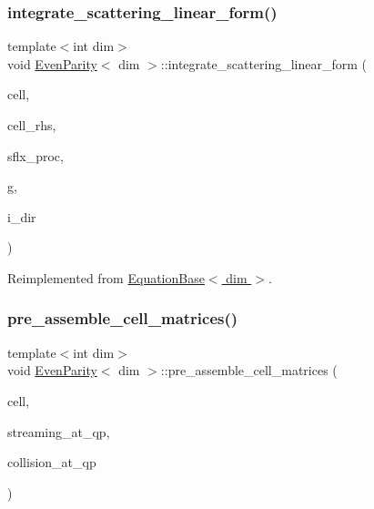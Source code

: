\mbox{\label{class_even_parity_a595082361e618c077877f92d04ebab0b}} 
\subsubsection{\texorpdfstring{integrate\+\_\+scattering\+\_\+linear\+\_\+form()}{integrate\_scattering\_linear\_form()}}
{\footnotesize\ttfamily template$<$int dim$>$ \\
void \hyperlink{class_even_parity}{Even\+Parity}$<$ dim $>$\+::integrate\+\_\+scattering\+\_\+linear\+\_\+form (\begin{DoxyParamCaption}\item[{typename Do\+F\+Handler$<$ dim $>$\+::active\+\_\+cell\+\_\+iterator \&}]{cell,  }\item[{Vector$<$ double $>$ \&}]{cell\+\_\+rhs,  }\item[{std\+::vector$<$ Vector$<$ double $>$ $>$ \&}]{sflx\+\_\+proc,  }\item[{const unsigned int \&}]{g,  }\item[{const unsigned int \&}]{i\+\_\+dir }\end{DoxyParamCaption})\hspace{0.3cm}{\ttfamily [virtual]}}



Reimplemented from \hyperlink{class_equation_base_aca5998c1afd2b89ee93d3fbbfde7f3d0}{Equation\+Base$<$ dim $>$}.

\mbox{\label{class_even_parity_a4cc64002161193e2227e962c9ecb8cf5}} 
\subsubsection{\texorpdfstring{pre\+\_\+assemble\+\_\+cell\+\_\+matrices()}{pre\_assemble\_cell\_matrices()}}
{\footnotesize\ttfamily template$<$int dim$>$ \\
void \hyperlink{class_even_parity}{Even\+Parity}$<$ dim $>$\+::pre\+\_\+assemble\+\_\+cell\+\_\+matrices (\begin{DoxyParamCaption}\item[{typename Do\+F\+Handler$<$ dim $>$\+::active\+\_\+cell\+\_\+iterator \&}]{cell,  }\item[{std\+::vector$<$ std\+::vector$<$ Full\+Matrix$<$ double $>$ $>$ $>$ \&}]{streaming\+\_\+at\+\_\+qp,  }\item[{std\+::vector$<$ Full\+Matrix$<$ double $>$ $>$ \&}]{collision\+\_\+at\+\_\+qp }\end{DoxyParamCaption})\hspace{0.3cm}{\ttfamily [virtual]}}



